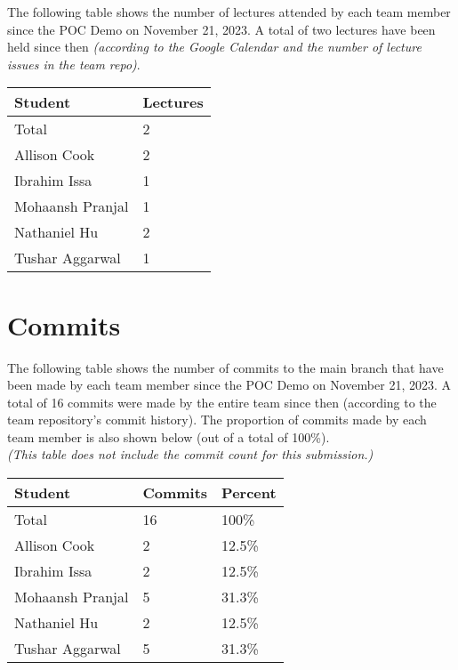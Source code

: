 \documentclass{article}
\begin{document}
The following table shows the number of lectures attended by each team member
since the POC Demo on November 21, 2023. A total of two lectures have been held
since then \textit{(according to the Google Calendar and the number of lecture
issues in the team repo)}.

\begin{table}[H]
  \centering
  \begin{tabular}{ll}
    \toprule
    \textbf{Student} & \textbf{Lectures} \\
    \midrule
    Total & 2 \\
    Allison Cook & 2 \\
    Ibrahim Issa & 1 \\
    Mohaansh Pranjal & 1 \\
    Nathaniel Hu & 2 \\
    Tushar Aggarwal & 1 \\
    \bottomrule
  \end{tabular}
\end{table}

\section{Commits}

The following table shows the number of commits to the main branch that have
been made by each team member since the POC Demo on November 21, 2023. A total
of 16 commits were made by the entire team since then (according to the team
repository's commit history). The proportion of commits made by each team member
is also shown below (out of a total of 100\%). \\
\textit{(This table does not include the commit count for this submission.)}

\begin{table}[H]
  \centering
  \begin{tabular}{lll}
    \toprule
    \textbf{Student} & \textbf{Commits} & \textbf{Percent} \\
    \midrule
    Total & 16 & 100\% \\
    Allison Cook & 2 & 12.5\% \\
    Ibrahim Issa & 2 & 12.5\% \\
    Mohaansh Pranjal & 5 & 31.3\% \\
    Nathaniel Hu & 2 & 12.5\% \\
    Tushar Aggarwal & 5 & 31.3\% \\
    \bottomrule
  \end{tabular}
\end{table}
\end{document}
